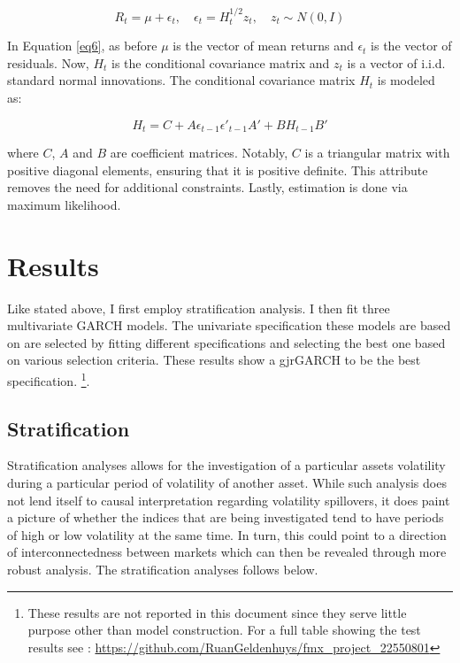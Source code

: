 \documentclass[11pt,preprint, authoryear]{elsarticle}
\numberwithin{equation}{section}
\numberwithin{figure}{section}
\numberwithin{table}{section}
\let\rmarkdownfootnote\footnote%
\def\footnote{\protect\rmarkdownfootnote}
\begin{document}
\begin{equation}
R_t = \mu + \epsilon_t, \quad \epsilon_t = H_t^{1/2} z_t, \quad z_t \sim N(0, I) \label{eq6}
\end{equation}

In Equation \ref{eq6}, as before \(\mu\) is the vector of mean returns
and \(\epsilon_t\) is the vector of residuals. Now, \(H_t\) is the
conditional covariance matrix and \(z_t\) is a vector of i.i.d. standard
normal innovations. The conditional covariance matrix \(H_t\) is modeled
as:

\begin{equation}
H_t = C + A \epsilon_{t-1} \epsilon'_{t-1} A' + B H_{t-1} B' \label{eq7}
\end{equation}

where \(C\), \(A\) and \(B\) are coefficient matrices. Notably, \(C\) is
a triangular matrix with positive diagonal elements, ensuring that it is
positive definite. This attribute removes the need for additional
constraints. Lastly, estimation is done via maximum likelihood.

\hypertarget{results}{%
\section{Results}\label{results}}

Like stated above, I first employ stratification analysis. I then fit
three multivariate GARCH models. The univariate specification these
models are based on are selected by fitting different specifications and
selecting the best one based on various selection criteria. These
results show a gjrGARCH to be the best specification.
\footnote{These results are not reported in this document since they serve little purpose other than model construction. For a full table showing the test results see : \url{https://github.com/RuanGeldenhuys/fmx_project_22550801}}.

\hypertarget{stratification}{%
\subsection{Stratification}\label{stratification}}

Stratification analyses allows for the investigation of a particular
assets volatility during a particular period of volatility of another
asset. While such analysis does not lend itself to causal interpretation
regarding volatility spillovers, it does paint a picture of whether the
indices that are being investigated tend to have periods of high or low
volatility at the same time. In turn, this could point to a direction of
interconnectedness between markets which can then be revealed through
more robust analysis. The stratification analyses follows below.
\end{document}
